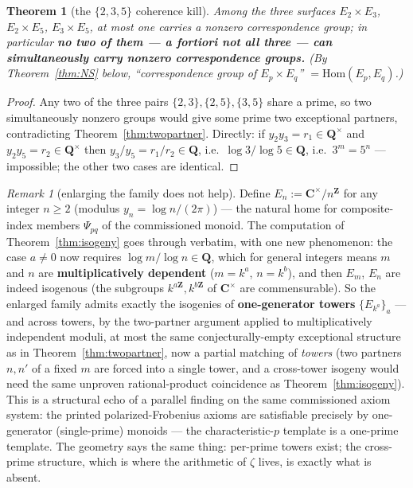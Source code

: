 \documentclass[11pt]{article}
\newtheorem{theorem}{Theorem}
\theoremstyle{definition}
\theoremstyle{remark}
\newtheorem{remark}{Remark}
\newcommand{\Z}{\mathbf{Z}}
\newcommand{\Q}{\mathbf{Q}}
\newcommand{\C}{\mathbf{C}}
\newcommand{\Hom}{\mathrm{Hom}}
\begin{document}
\begin{theorem}[the $\{2,3,5\}$ coherence kill]
\label{thm:coherence}
Among the three surfaces $E_2\times E_3$, $E_2\times E_5$, $E_3\times E_5$,
at most one carries a nonzero correspondence group; in particular \textbf{no
two of them --- a fortiori not all three --- can simultaneously carry
nonzero correspondence groups.} (By Theorem~\ref{thm:NS} below,
``correspondence group of $E_p\times E_q$'' $= \Hom(E_p, E_q)$.)
\end{theorem}

\begin{proof}
Any two of the three pairs $\{2,3\}, \{2,5\}, \{3,5\}$ share a prime, so two
simultaneously nonzero groups would give some prime two exceptional
partners, contradicting Theorem~\ref{thm:twopartner}. Directly: if
$y_2 y_3 = r_1 \in \Q^\times$ and $y_2 y_5 = r_2 \in \Q^\times$ then
$y_3/y_5 = r_1/r_2 \in \Q$, i.e.\ $\log 3/\log 5 \in \Q$, i.e.\
$3^m = 5^n$ --- impossible; the other two cases are identical.
\end{proof}

\begin{remark}[enlarging the family does not help]
\label{rem:enlarge}
Define $E_n := \C^\times/n^\Z$ for any integer $n \geq 2$ (modulus
$y_n = \log n/(2\pi)$) --- the natural home for composite-index members
$\Psi_{pq}$ of the commissioned monoid. The computation of
Theorem~\ref{thm:isogeny} goes through verbatim, with one new phenomenon:
the case $a \neq 0$ now requires $\log m/\log n \in \Q$, which for general
integers means $m$ and $n$ are \textbf{multiplicatively dependent}
($m = k^a$, $n = k^b$), and then $E_m$, $E_n$ are indeed isogenous (the
subgroups $k^{a\Z}, k^{b\Z}$ of $\C^\times$ are commensurable). So the
enlarged family admits exactly the isogenies of \textbf{one-generator
towers} $\{E_{k^a}\}_a$ --- and across towers, by the two-partner argument
applied to multiplicatively independent moduli, at most the same
conjecturally-empty exceptional structure as in
Theorem~\ref{thm:twopartner}, now a partial matching of \emph{towers} (two
partners $n, n'$ of a fixed $m$ are forced into a single tower, and a
cross-tower isogeny would need the same unproven rational-product
coincidence as Theorem~\ref{thm:isogeny}). This is a structural echo of a
parallel finding on the same commissioned axiom system: the printed
polarized-Frobenius axioms are satisfiable precisely by one-generator
(single-prime) monoids --- the characteristic-$p$ template is a one-prime
template. The geometry says the same thing: per-prime towers exist; the
cross-prime structure, which is where the arithmetic of $\zeta$ lives, is
exactly what is absent.
\end{remark}
\end{document}
